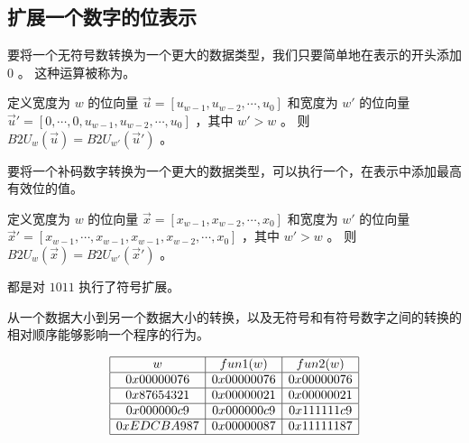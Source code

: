 {    \subsection{扩展一个数字的位表示}
    {
        要将一个无符号数转换为一个更大的数据类型，我们只要简单地在表示的开头添加 $0$ 。
        这种运算被称为。

        \begin{defines}[无符号数的零扩展]
            定义宽度为 $w$ 的位向量 $\vec u = [u_{w - 1}, u_{w - 2}, \cdots, u_0]$  和宽度为 $w'$ 的位向量 $\vec u' = [0, \cdots, 0, u_{w - 1}, u_{w - 2}, \cdots, u_0]$ ，其中 $w' > w$ 。
            则 $B2U_w(\vec u) = B2U_{w'}(\vec u')$ 。
        \end{defines}

        要将一个补码数字转换为一个更大的数据类型，可以执行一个，在表示中添加最高有效位的值。

        \begin{defines}
            定义宽度为 $w$ 的位向量 $\vec x = [x_{w - 1}, x_{w - 2}, \cdots, x_0]$  和宽度为 $w'$ 的位向量 $\vec x' = [x_{w - 1}, \cdots, x_{w - 1}, x_{w - 1}, x_{w - 2}, \cdots, x_0]$ ，其中 $w' > w$ 。
            则 $B2U_w(\vec x) = B2U_{w'}(\vec x')$ 。
        \end{defines}

        \begin{practicec}
            都是对 $1011$ 执行了符号扩展。
        \end{practicec}

        从一个数据大小到另一个数据大小的转换，以及无符号和有符号数字之间的转换的相对顺序能够影响一个程序的行为。

        \begin{practicec}
            \begin{table}[H]
                \[
                    \begin{array}{|c|c|c|}
                        \hline
                        w & fun1(w) & fun2(w) \\
                        \hline
                        0x00000076 & 0x00000076 & 0x00000076 \\
                        \hline
                        0x87654321 & 0x00000021 & 0x00000021 \\
                        \hline
                        0x000000c9 & 0x000000c9 & 0x111111c9 \\
                        \hline
                        0xEDCBA987 & 0x00000087 & 0x11111187 \\
                        \hline
                    \end{array}
                \]
            \end{table}
        \end{practicec}
    }

}
